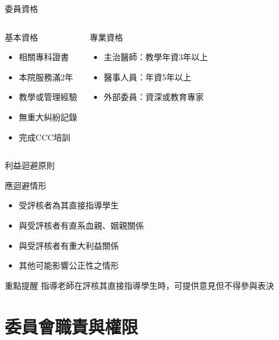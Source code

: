 \documentclass[aspectratio=169,12pt]{beamer}
\begin{document}
\begin{frame}{委員資格}
\begin{columns}[T]
\begin{block}{基本資格}
\begin{itemize}
    \item 相關專科證書
    \item 本院服務滿2年
    \item 教學或管理經驗
    \item 無重大糾紛記錄
    \item 完成CCC培訓
\end{itemize}
\end{block}

\begin{block}{專業資格}
\begin{itemize}
    \item 主治醫師：教學年資3年以上
    \item 醫事人員：年資5年以上
    \item 外部委員：資深或教育專家
\end{itemize}
\end{block}
\end{columns}
\end{frame}

\begin{frame}{利益迴避原則}
\begin{alertblock}{應迴避情形}
\begin{itemize}
    \item 受評核者為其直接指導學生
    \item 與受評核者有直系血親、姻親關係
    \item 與受評核者有重大利益關係
    \item 其他可能影響公正性之情形
\end{itemize}
\end{alertblock}

\begin{exampleblock}{重點提醒}
指導老師在評核其直接指導學生時，可提供意見但不得參與表決
\end{exampleblock}
\end{frame}

\section{委員會職責與權限}
\end{document}

